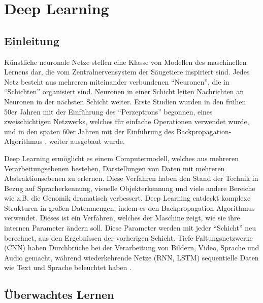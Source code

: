 \chapter{Deep Learning} \label{ch2}
\section{Einleitung}
Künstliche neuronale Netze stellen eine Klasse von Modellen des maschinellen Lernens dar, die vom Zentralnervensystem der Säugetiere inspiriert sind. Jedes Netz besteht aus mehreren miteinander verbundenen \enquote{Neuronen}, die in \enquote{Schichten} organisiert sind. Neuronen in einer Schicht leiten Nachrichten an Neuronen in der nächsten Schicht weiter. Erste Studien wurden in den frühen 50er Jahren mit der Einführung des \enquote{Perzeptrons} \cite{Rosenblatt} begonnen, eines zweischichtigen Netzwerks, welches für einfache Operationen verwendet wurde, und in den späten 60er Jahren mit der Einführung des Backpropagation-Algorithmus \cite{Werbos1990}, \cite{Hinton} weiter ausgebaut wurde.



Deep Learning ermöglicht es einem Computermodell, welches aus mehreren Verarbeitungsebenen bestehen, Darstellungen von Daten mit mehreren Abstraktionsebenen zu erlernen. Diese Verfahren haben den Stand der Technik in Bezug auf Spracherkennung, visuelle Objekterkennung und viele andere Bereiche wie z.B. die Genomik dramatisch verbessert. Deep Learning entdeckt komplexe Strukturen in großen Datenmengen, indem es den Backpropagation-Algorithmus verwendet. Dieses ist ein Verfahren, welches der Maschine zeigt, wie sie ihre internen Parameter ändern soll. Diese Parameter werden mit jeder \enquote{Schicht} neu berechnet, aus den Ergebnissen der vorherigen Schicht. Tiefe Faltungsnetzwerke (CNN) haben Durchbrüche bei der Verarbeitung von Bildern, Video, Sprache und Audio gemacht, während wiederkehrende Netze (RNN, LSTM) sequentielle Daten wie Text und Sprache beleuchtet haben \cite*{Lecun2015}.

\section{Überwachtes Lernen}


